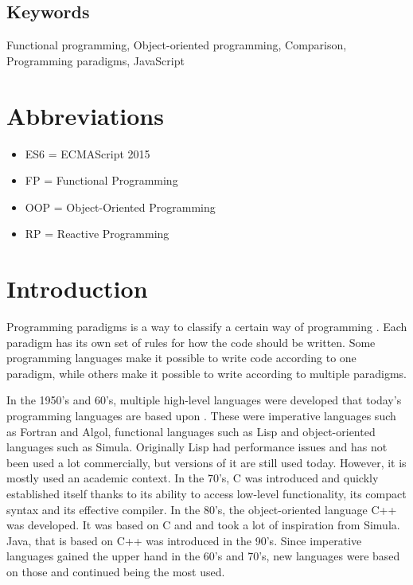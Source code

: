 \documentclass {article}
\begin{document}
\subsection*{Keywords}
Functional programming, Object-oriented programming, Comparison, Programming paradigms, JavaScript

\newpage
\tableofcontents
\newpage
{}
\newpage
\listoffigures
\newpage
\listoftables
\newpage
\section*{Abbreviations}
\begin{itemize}[leftmargin=*]
\item [ ] ES6 = ECMAScript 2015
\item [ ] FP = Functional Programming
\item [ ] OOP = Object-Oriented Programming
\item [ ] RP = Reactive Programming
\end{itemize}

\newpage
\section{Introduction}
Programming paradigms is a way to classify a certain way of programming \cite{programming-paradigms}. Each paradigm has its own set of rules for how the code should be written. Some programming languages make it possible to write code according to one paradigm,  while others make it possible to write according to multiple paradigms. 

In the 1950's and 60's, multiple high-level languages were developed that today's programming languages are based upon \cite{gabmar}. These were imperative languages such as Fortran and Algol, functional languages such as Lisp and object-oriented languages such as Simula. Originally Lisp had performance issues and has not been used a lot commercially, but versions of it are still used today. However, it is mostly used an academic context. In the 70's, C was introduced and quickly established itself thanks to its ability to access low-level functionality, its compact syntax and its effective compiler. In the 80's, the object-oriented language C++ was developed. It was based on C and and took a lot of inspiration from Simula. Java, that is based on C++ was introduced in the 90's. Since imperative languages gained the upper hand in the 60's and 70's, new languages were based on those and continued being the most used. 
\end{document}
